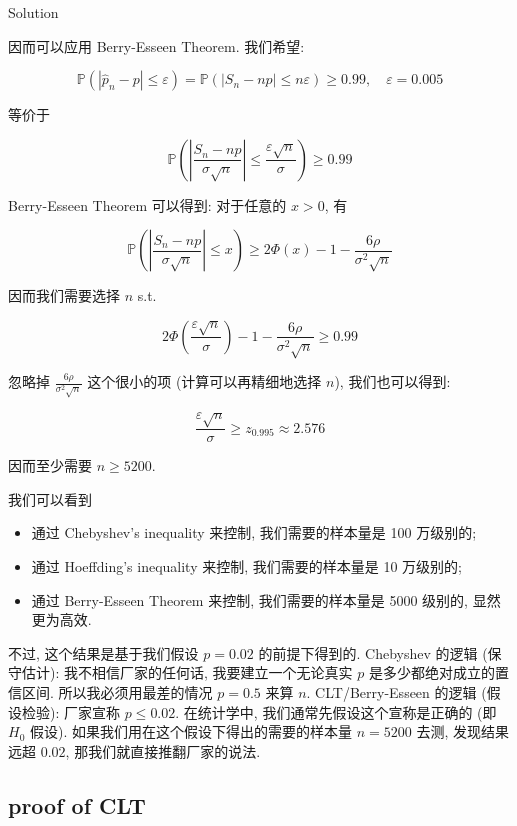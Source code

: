 \documentclass{qlnotes-export}
\begin{document}
\begin{qlsolution}{Solution}
\begin{itemize}
  因而可以应用 Berry-Esseen Theorem. 我们希望:

  \[{\mathbb{P}}\left( {\left| {{\widehat{p}}_{n} - p} \right| \leq \varepsilon} \right) = {\mathbb{P}}\left( {\left| {S_{n} - np} \right| \leq n\varepsilon} \right) \geq 0.99,\quad\varepsilon = 0.005\]

  等价于

  \[{\mathbb{P}}\left( {\left| \frac{S_{n} - np}{\sigma\sqrt{n}} \right| \leq \frac{\varepsilon\sqrt{n}}{\sigma}} \right) \geq 0.99\]

  Berry-Esseen Theorem 可以得到: 对于任意的 \(x > 0\), 有

  \[{\mathbb{P}}\left( {\left| \frac{S_{n} - np}{\sigma\sqrt{n}} \right| \leq x} \right) \geq 2\Phi(x) - 1 - \frac{6\rho}{\sigma^{2}\sqrt{n}}\]

  因而我们需要选择 \(n\) s.t.

  \[2\Phi\left( \frac{\varepsilon\sqrt{n}}{\sigma} \right) - 1 - \frac{6\rho}{\sigma^{2}\sqrt{n}} \geq 0.99\]

  忽略掉 \(\frac{6\rho}{\sigma^{2}\sqrt{n}}\) 这个很小的项 (计算可以再精细地选择 \(n\)), 我们也可以得到:

  \[\frac{\varepsilon\sqrt{n}}{\sigma} \geq z_{0.995} \approx 2.576\]

  因而至少需要 \(n \geq 5200\).
\end{itemize}

我们可以看到

\begin{itemize}
\item
  通过 Chebyshev's inequality 来控制, 我们需要的样本量是 100 万级别的;
\item
  通过 Hoeffding's inequality 来控制, 我们需要的样本量是 10 万级别的;
\item
  通过 Berry-Esseen Theorem 来控制, 我们需要的样本量是 5000 级别的, 显然更为高效.
\end{itemize}

不过, 这个结果是基于我们假设 \(p = 0.02\) 的前提下得到的. Chebyshev 的逻辑 (保守估计): 我不相信厂家的任何话, 我要建立一个无论真实 \(p\) 是多少都绝对成立的置信区间. 所以我必须用最差的情况 \(p = 0.5\) 来算 \(n\). CLT/Berry-Esseen 的逻辑 (假设检验): 厂家宣称 \(p \leq 0.02\). 在统计学中, 我们通常先假设这个宣称是正确的 (即 \(H_{0}\) 假设). 如果我们用在这个假设下得出的需要的样本量 \(n = 5200\) 去测, 发现结果远超 \(0.02\), 那我们就直接推翻厂家的说法.

\end{qlsolution}

\subsection{proof of CLT}\label{proof-of-clt}

\printbibliography
\end{document}
